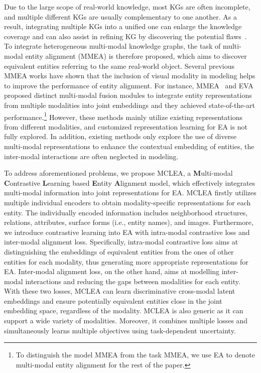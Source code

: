 \documentclass[11pt]{article}
\begin{document}
Due to the large scope of real-world knowledge, most KGs are often incomplete, and multiple different KGs are usually complementary to one another.
As a result, integrating multiple KGs into a unified one can enlarge the knowledge coverage and can also assist in refining KG by discovering the potential flaws~\cite{chen2020mmea}.
To integrate heterogeneous multi-modal knowledge graphs, the task of multi-modal entity alignment (MMEA) is therefore proposed, which aims to discover equivalent entities referring to the same real-world object.
Several previous MMEA works have shown that the inclusion of visual modality in modeling helps to improve the performance of entity alignment. For instance, MMEA~\cite{chen2020mmea} and EVA~\cite{liu2021visual} proposed distinct multi-modal fusion modules to integrate entity representations from multiple modalities into joint embeddings and they achieved state-of-the-art performance.\footnote{To distinguish the model MMEA from the task MMEA, we use EA to denote multi-modal entity alignment for the rest of the paper.}
However, these methods mainly utilize existing representations from different modalities, and customized representation learning for EA is not fully explored. In addition, existing methods only explore the use of diverse multi-modal representations to enhance the contextual embedding of entities, the inter-modal interactions are often neglected in modeling.

To address aforementioned problems, we propose MCLEA, a \textbf{M}ulti-modal \textbf{C}ontrastive \textbf{L}earning based \textbf{E}ntity \textbf{A}lignment model, which effectively integrates multi-modal information into joint representations for EA.
MCLEA firstly utilizes multiple individual encoders to obtain modality-specific representations for each entity. The individually encoded information includes neighborhood structures, relations, attributes, surface forms (i.e., entity names), and images.
Furthermore, we introduce contrastive learning into EA with intra-modal contrastive loss and inter-modal alignment loss.
Specifically, intra-modal contrastive loss aims at distinguishing the embeddings of equivalent entities from the ones of other entities for each modality, thus generating more appropriate representations for EA.
Inter-modal alignment loss, on the other hand, aims at modelling inter-modal interactions and reducing the gaps between modalities for each entity.
With these two losses, MCLEA can learn discriminative cross-modal latent embeddings and ensure potentially equivalent entities close in the joint embedding space, regardless of the modality.
MCLEA is also generic as it can support a wide variety of modalities.
Moreover, it combines multiple losses and simultaneously learns multiple objectives using task-dependent uncertainty.
\end{document}
